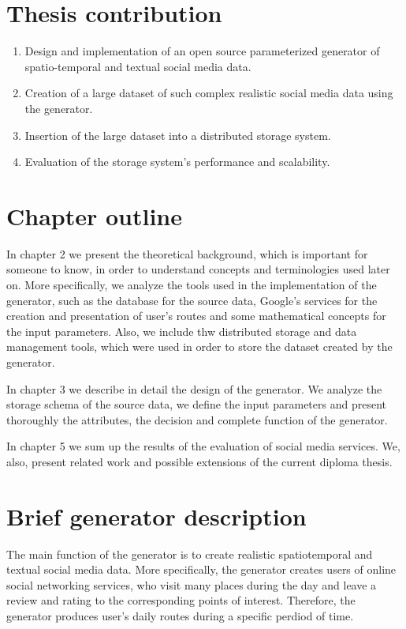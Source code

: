 \section{Thesis contribution}

\begin{enumerate}
  \item Design and implementation of an open source parameterized generator of spatio-temporal and textual social media data. 
  \item Creation of a large dataset of such complex realistic social media data using the generator.
  \item Insertion of the large dataset into a distributed storage system. 
  \item Evaluation of the storage system's performance and scalability.
\end{enumerate}

\section{Chapter outline}

In chapter 2 we present the theoretical background, which is important for someone to know, in order to understand concepts and terminologies used later on. 
More specifically, we analyze the tools used in the implementation of the generator, such as the database for the source data,
Google's services for the creation and presentation of user's routes and some mathematical concepts for the input parameters. Also,
we include thw distributed storage and data management tools, which were used in order to store the dataset created by the generator. 

In chapter 3 we describe in detail the design of the generator. We analyze the storage schema of the source data, we define the input parameters and 
present thoroughly the attributes, the decision and complete function of the generator. 

In chapter 5 we sum up the results of the evaluation of social media services. We, also, present related work and possible extensions of the current 
diploma thesis.

\section{Brief generator description}

The main function of the generator is to create realistic spatiotemporal and textual social media data. More specifically, the generator creates users 
of online social networking services, who visit many places during the day and leave a review and rating to the corresponding points of interest. 
Therefore, the generator produces user's daily routes during a specific perdiod of time.

